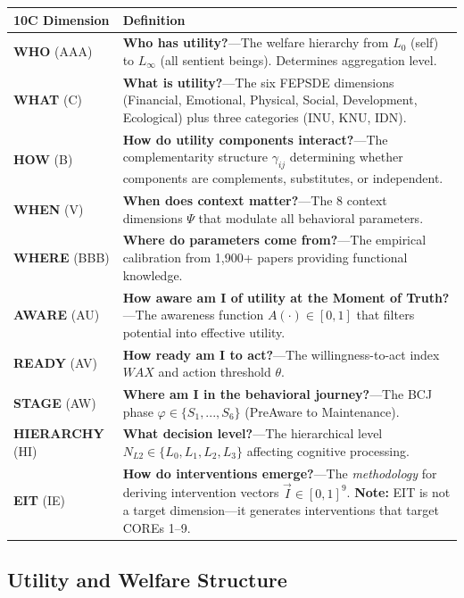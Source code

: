 \begin{longtable}{@{}p{2.8cm}p{10cm}@{}}
\toprule
\textbf{10C Dimension} & \textbf{Definition} \\
\midrule
\endhead
\textbf{WHO} (AAA) & \textbf{Who has utility?}---The welfare hierarchy from $L_0$ (self) to $L_\infty$ (all sentient beings). Determines aggregation level. \\[6pt]
\textbf{WHAT} (C) & \textbf{What is utility?}---The six FEPSDE dimensions (Financial, Emotional, Physical, Social, Development, Ecological) plus three categories (INU, KNU, IDN). \\[6pt]
\textbf{HOW} (B) & \textbf{How do utility components interact?}---The complementarity structure $\gamma_{ij}$ determining whether components are complements, substitutes, or independent. \\[6pt]
\textbf{WHEN} (V) & \textbf{When does context matter?}---The 8 context dimensions $\Psi$ that modulate all behavioral parameters. \\[6pt]
\textbf{WHERE} (BBB) & \textbf{Where do parameters come from?}---The empirical calibration from 1,900+ papers providing functional knowledge. \\[6pt]
\textbf{AWARE} (AU) & \textbf{How aware am I of utility at the Moment of Truth?}---The awareness function $A(\cdot) \in [0,1]$ that filters potential into effective utility. \\[6pt]
\textbf{READY} (AV) & \textbf{How ready am I to act?}---The willingness-to-act index $WAX$ and action threshold $\theta$. \\[6pt]
\textbf{STAGE} (AW) & \textbf{Where am I in the behavioral journey?}---The BCJ phase $\varphi \in \{S_1, ..., S_6\}$ (PreAware to Maintenance). \\[6pt]
\textbf{HIERARCHY} (HI) & \textbf{What decision level?}---The hierarchical level $N_{L2} \in \{L_0, L_1, L_2, L_3\}$ affecting cognitive processing. \\[6pt]
\textbf{EIT} (IE) & \textbf{How do interventions emerge?}---The \textit{methodology} for deriving intervention vectors $\vec{I} \in [0,1]^9$. \textbf{Note:} EIT is not a target dimension---it generates interventions that target COREs 1--9. \\
\bottomrule
\end{longtable}

\subsection{Utility and Welfare Structure}


